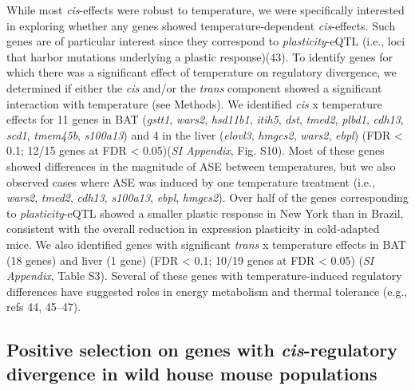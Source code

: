 \documentclass[9pt,twocolumn,twoside,lineno]{pnas-new}
\begin{document}
While most \emph{cis}-effects were robust to temperature, we were
specifically interested in exploring whether any genes showed
temperature-dependent \emph{cis}-effects. Such genes are of particular
interest since they correspond to \emph{plasticity}-eQTL (i.e., loci
that harbor mutations underlying a plastic response)(43). To identify
genes for which there was a significant effect of temperature on
regulatory divergence, we determined if either the \emph{cis} and/or the
\emph{trans} component showed a significant interaction with temperature
(see Methods). We identified \emph{cis} x temperature effects for 11
genes in BAT (\emph{gstt1}, \emph{wars2}, \emph{hsd11b1}, \emph{itih5},
\emph{dst}, \emph{tmed2}, \emph{plbd1}, \emph{cdh13}, \emph{scd1},
\emph{tmem45b}, \emph{s100a13}) and 4 in the liver (\emph{elovl3},
\emph{hmgcs2}, \emph{wars2}, \emph{ebpl}) (FDR \textless{} 0.1; 12/15
genes at FDR \textless{} 0.05)(\emph{SI Appendix}, Fig. S10). Most of
these genes showed differences in the magnitude of ASE between
temperatures, but we also observed cases where ASE was induced by one
temperature treatment (i.e., \emph{wars2}, \emph{tmed2}, \emph{cdh13},
\emph{s100a13}, \emph{ebpl}, \emph{hmgcs2}). Over half of the genes
corresponding to \emph{plasticity}-eQTL showed a smaller plastic
response in New York than in Brazil, consistent with the overall
reduction in expression plasticity in cold-adapted mice. We also
identified genes with significant \emph{trans} x temperature effects in
BAT (18 genes) and liver (1 gene) (FDR \textless{} 0.1; 10/19 genes at
FDR \textless{} 0.05) (\emph{SI Appendix}, Table S3). Several of these
genes with temperature-induced regulatory differences have suggested
roles in energy metabolism and thermal tolerance (e.g., refs 44,
45--47).

\hypertarget{positive-selection-on-genes-with-cis-regulatory-divergence-in-wild-house-mouse-populations}{%
\subsection*{\texorpdfstring{Positive selection on genes with
\emph{cis}-regulatory divergence in wild house mouse
populations}{Positive selection on genes with cis-regulatory divergence in wild house mouse populations}}\label{positive-selection-on-genes-with-cis-regulatory-divergence-in-wild-house-mouse-populations}}
\end{document}
